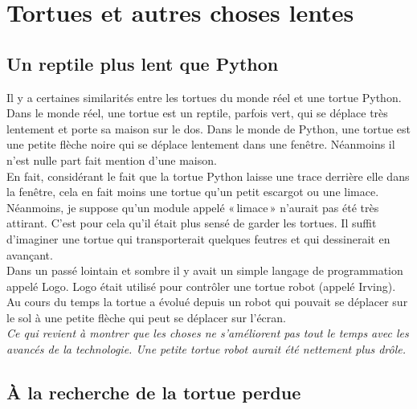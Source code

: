 


\chapter{Tortues et autres choses lentes\label{chap:tortue1}}
\section{Un reptile plus lent que Python}
Il y a certaines similarités entre les tortues du monde réel et une tortue Python.
Dans le monde réel, une tortue   est un reptile, parfois vert, qui se déplace très lentement et porte sa maison sur le dos. Dans le monde de Python, une tortue est une petite flèche noire qui se déplace lentement dans une fenêtre. Néanmoins il n'est nulle part fait mention d'une maison.\\

En fait, considérant le fait que la tortue Python laisse une trace derrière elle dans la fenêtre, cela en fait moins une tortue qu'un petit escargot ou une limace. Néanmoins, je suppose qu'un module appelé « limace »  n'aurait pas été très attirant. C'est pour cela qu'il était plus sensé de garder les tortues. Il suffit d'imaginer une tortue qui transporterait quelques feutres et qui dessinerait en avançant.\\

Dans un passé lointain et sombre il y avait un simple langage de programmation appelé Logo. Logo était utilisé pour contrôler une tortue robot (appelé Irving). Au cours du temps la tortue a évolué depuis un robot qui pouvait se déplacer sur le sol à une petite flèche qui peut se déplacer sur l'écran.\\

\emph{Ce qui revient à montrer que les choses ne s'améliorent pas tout le temps avec les avancés de la technologie. Une petite tortue robot aurait été nettement plus drôle.}\\

\section{À la recherche de la tortue perdue}

